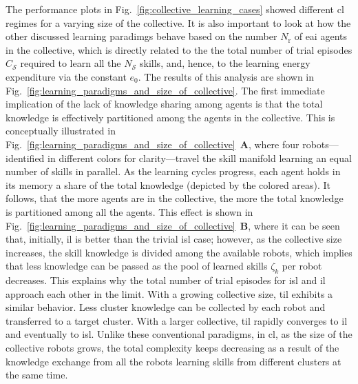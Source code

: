 \documentclass[12pt]{article}
\begin{document}
The performance plots in Fig.~\ref{fig:collective_learning_cases} showed different \ac{cl} regimes for a varying size of the collective. It is also important to look at how the other discussed learning paradimgs behave based on the number $N_\mathrm{r}$ of \ac{eai} agents in the collective, which is directly related to the the total number of trial episodes $C_\mathcal{S}$ required to learn all the $N_\mathcal{S}$ skills, and, hence, to the learning energy expenditure via the constant $e_0$. The results of this analysis are shown in Fig.~\ref{fig:learning_paradigms_and_size_of_collective}. The first immediate implication of the lack of knowledge sharing among agents is that the total knowledge is effectively partitioned among the agents in the collective. This is conceptually illustrated in Fig.~\ref{fig:learning_paradigms_and_size_of_collective}~\textbf{A}, where four robots---identified in different colors for clarity---travel the skill manifold learning an equal number of skills in parallel. As the learning cycles progress, each agent holds in its memory a share of the total knowledge (depicted by the colored areas). It follows, that the more agents are in the collective, the more the total knowledge is partitioned among all the agents. This effect is shown in Fig.~\ref{fig:learning_paradigms_and_size_of_collective}~\textbf{B}, where it can be seen that, initially, \ac{il} is better than the trivial \ac{isl} case; however, as the collective size increases, the skill knowledge is divided among the available robots, which implies that less knowledge can be passed as the pool of learned skills $\zeta_k$ per robot decreases. This explains why the total number of trial episodes for \ac{isl} and \ac{il} approach each other in the limit. With a growing collective size, \ac{til} exhibits a similar behavior. Less cluster knowledge can be collected by each robot and transferred to a target cluster. With a larger collective, \ac{til} rapidly converges to \ac{il} and eventually to \ac{isl}. Unlike these conventional paradigms, in \ac{cl}, as the size of the collective robots grows, the total complexity keeps decreasing as a result of the knowledge exchange from all the robots learning skills from different clusters at the same time.

\end{document}
